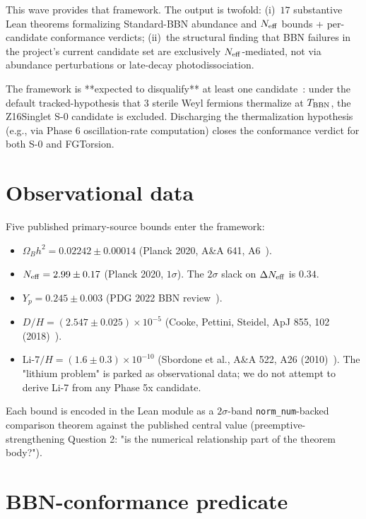 \documentclass[twocolumn]{revtex4-2}
\newcommand{\OmegaBh}{\Omega_B h^2}
\newcommand{\Neff}{N_{\rm eff}}
\newcommand{\dNeff}{\Delta N_{\rm eff}}
\newcommand{\Yp}{Y_p}
\begin{document}
This wave provides that framework. The output is twofold:
(i)~$17$ substantive Lean theorems formalizing Standard-BBN
abundance and $N_{\rm eff}$ bounds + per-candidate conformance
verdicts; (ii)~the structural finding that BBN failures in the
project's current candidate set are exclusively
$N_{\rm eff}$-mediated, not via abundance perturbations or
late-decay photodissociation.

The framework is **expected to disqualify** at least one
candidate~\cite{Phase6bRoadmap}: under the default tracked-hypothesis
that 3 sterile Weyl fermions thermalize at $T_{\rm BBN}$, the
Z16Singlet S-0 candidate is excluded. Discharging the thermalization
hypothesis (e.g., via Phase 6 oscillation-rate computation) closes
the conformance verdict for both S-0 and FGTorsion.

\section{Observational data}
\label{sec:data}

Five published primary-source bounds enter the framework:
\begin{itemize}
\item $\OmegaBh = 0.02242 \pm 0.00014$ (Planck 2020,
A\&A 641, A6~\cite{Planck2020VI}).
\item $\Neff = 2.99 \pm 0.17$ (Planck 2020, $1\sigma$). The
$2\sigma$ slack on $\dNeff$ is $0.34$.
\item $\Yp = 0.245 \pm 0.003$ (PDG 2022 BBN review~\cite{PDG2022}).
\item $D/H = (2.547 \pm 0.025) \times 10^{-5}$ (Cooke, Pettini,
Steidel, ApJ 855, 102 (2018)~\cite{Cooke2018}).
\item $\mathrm{Li}\text{-}7/H = (1.6 \pm 0.3) \times 10^{-10}$
(Sbordone et al., A\&A 522, A26 (2010)~\cite{Sbordone2010}). The
"lithium problem" is parked as observational data; we do not attempt
to derive Li-7 from any Phase 5x candidate.
\end{itemize}
Each bound is encoded in the Lean module as a $2\sigma$-band
\texttt{norm\_num}-backed comparison theorem against the published
central value (preemptive-strengthening Question 2: "is the numerical
relationship part of the theorem body?").

\section{BBN-conformance predicate}
\label{sec:predicate}
\end{document}
